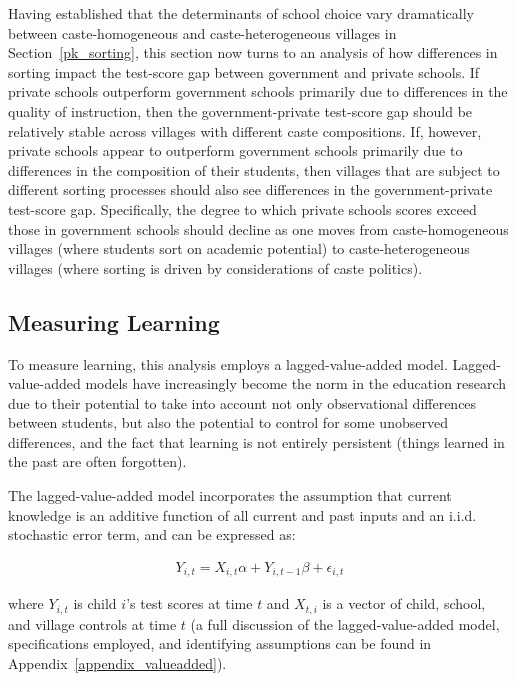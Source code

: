 \documentclass[Eubank_pk_ethnic_sorting.tex]{subfiles}
\begin{document}
Having established that the determinants of school choice vary dramatically between caste-homogeneous and caste-heterogeneous villages in Section~\ref{pk_sorting}, this section now turns to an analysis of how differences in sorting impact the test-score gap between government and private schools. If private schools outperform government schools primarily due to differences in the quality of instruction, then the government-private test-score gap should be relatively stable across villages with different caste compositions. If, however, private schools appear to outperform government schools primarily due to differences in the composition of their students, then villages that are subject to different sorting processes should also see differences in the government-private test-score gap. Specifically, the degree to which private schools scores exceed those in government schools should decline as one moves from caste-homogeneous villages (where students sort on academic potential) to caste-heterogeneous villages (where sorting is driven by considerations of caste politics).

\subsection{Measuring Learning}\label{value_added_models}

To measure learning, this analysis employs a lagged-value-added model. Lagged-value-added models have increasingly become the norm in the education research \citep{Gordon:2006wt,McCaffrey:2003vk,Hanushek:2003hz} due to their potential to take into account not only observational differences between students, but also the potential to control for some unobserved differences, and the fact that learning is not entirely persistent (things learned in the past are often forgotten).

The lagged-value-added model incorporates the assumption that current knowledge is an additive function of all current and past inputs and an i.i.d. stochastic error term, and can be expressed as:

\begin{eqnarray}
	Y_{i,t}=X_{i,t}\alpha+Y_{i,t-1}\beta + \epsilon_{i,t}\label{primary}
\end{eqnarray}

where $Y_{i,t}$ is child $i$'s test scores at time $t$ and $X_{t,i}$ is a vector of child, school, and village controls at time $t$ (a full discussion of the lagged-value-added model, specifications employed, and identifying assumptions can be found in Appendix~\ref{appendix_valueadded}).
\end{document}
